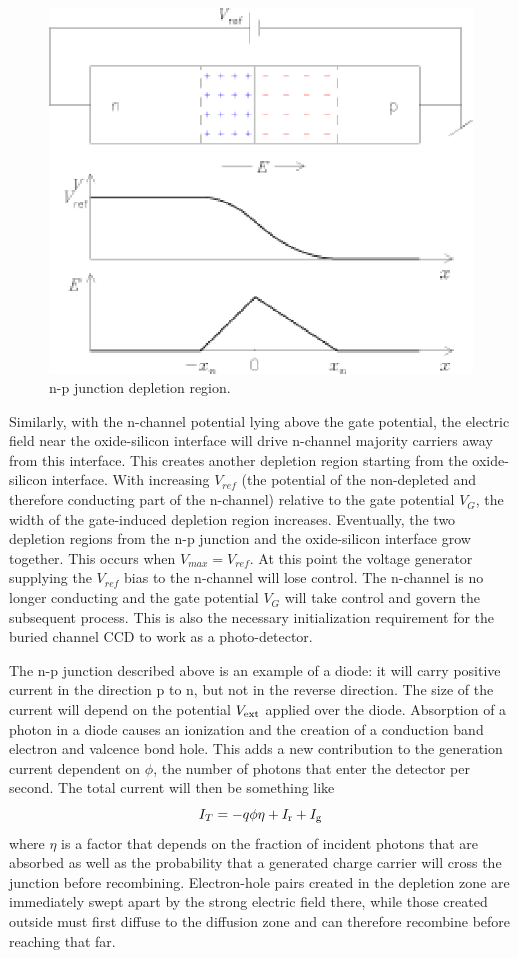 \begin{figure}[h]
  \centering
	\includegraphics{CCD_junction.eps}
  \caption{n-p junction depletion region.}
  \label{CCD.figjunction}
\end{figure}

Similarly, with the n-channel potential lying above the gate
potential, the electric field near the oxide-silicon interface will
drive n-channel majority carriers away from this interface. This
creates another depletion region starting from the oxide-silicon
interface. With increasing $V_{ref}$ (the potential of the non-depleted
and therefore conducting part of the n-channel) relative to the gate
potential $V_G$, the width of the gate-induced depletion region
increases. Eventually, the two depletion regions from the n-p junction
and the oxide-silicon interface grow together. This occurs when
$V_{max} = V_{ref}$. At this point the voltage generator supplying the
$V_{ref}$ bias to the n-channel will lose control. The n-channel is
no longer conducting and the gate potential $V_G$ will take control
and govern the subsequent process. This is also the necessary
initialization requirement for the buried channel CCD to work as a
photo-detector.

The n-p junction described above is an example of a diode: it will
carry positive current in the direction p to n, but not in the reverse
direction. The size of the current will depend on the potential
$V_{\rm ext}$ applied over the diode.
Absorption of a photon in a diode causes an ionization and
the creation of a conduction band electron and valcence bond
hole. This adds a new contribution to the generation current dependent
on $\phi$, the number of photons that enter the detector per
second. The total current will then be something like
\[
I_{T}=-q\phi\eta+I_{\rm r}+I_{\rm g}
\]
where $\eta$ is a factor that depends on the fraction of incident
photons that are absorbed as well as the probability that a generated
charge carrier will cross the junction before
recombining. Electron-hole pairs created in the depletion zone are
immediately swept apart by the strong electric field there, while
those created outside must first diffuse to the diffusion zone and can
therefore recombine before reaching that far. 

